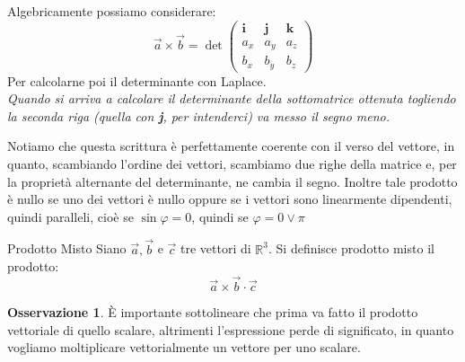 \documentclass[11pt,a4paper,twoside]{article}
\theoremstyle{definition}
\newtheorem*{oss}{Osservazione}
\begin{document}
\begin{center}
\end{center}

Algebricamente possiamo considerare:
\[
	\vec a \times \vec b = \det \begin{pmatrix} \mathbf i & \mathbf j & \mathbf k\\ a_x & a_y & a_z\\ b_x & b_y & b_z\end{pmatrix}
\]
Per calcolarne poi il determinante con Laplace.\\
\textit{Quando si arriva a calcolare il determinante della sottomatrice ottenuta togliendo la seconda riga (quella con \textbf j, per intenderci) va messo il segno meno.}

Notiamo che questa scrittura è perfettamente coerente con il verso del vettore, in quanto, scambiando l'ordine dei vettori, scambiamo due righe della matrice e, per la proprietà alternante del determinante, ne cambia il segno.
Inoltre tale prodotto è nullo se uno dei vettori è nullo oppure se i vettori sono linearmente dipendenti, quindi paralleli, cioè se $\sin \varphi = 0$, quindi se $\varphi = 0 \vee \pi$

\begin{defn}{Prodotto Misto}{}
	Siano $\vec a, \vec b$ e $\vec c$ tre vettori di $\mathbb R^3$. Si definisce prodotto misto il prodotto:
	\[ \vec a \times \vec b \cdot \vec c \]
\end{defn}

\begin{oss}
	È importante sottolineare che prima va fatto il prodotto vettoriale di quello scalare, altrimenti l'espressione perde di significato, in quanto vogliamo moltiplicare vettorialmente un vettore per uno scalare.
\end{oss}
\end{document}
